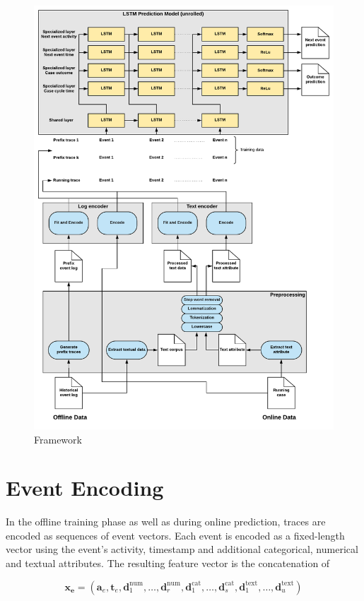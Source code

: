 \begin{figure}
	\includegraphics[width=\textwidth]{figures/framework}
	\caption{Framework}
	\label{fig:framework}
\end{figure}


\section{Event Encoding}

In the offline training phase as well as during online prediction, traces are encoded as sequences of event vectors.
Each event is encoded as a fixed-length vector using the event's activity, timestamp and additional categorical, numerical and textual attributes.
The resulting feature vector is the concatenation of 

\begin{equation}
	\bm{x_e}=(
	\bm{a}_e,
	\bm{t}_e,
	\bm{d}_1^\mathrm{num}, \dots,\bm{d}_r^\mathrm{num},
	\bm{d}_1^\mathrm{cat}, \dots,\bm{d}_s^\mathrm{cat},
	\bm{d}_1^\mathrm{text}, \dots, \bm{d}_u^\mathrm{text})
\end{equation}


